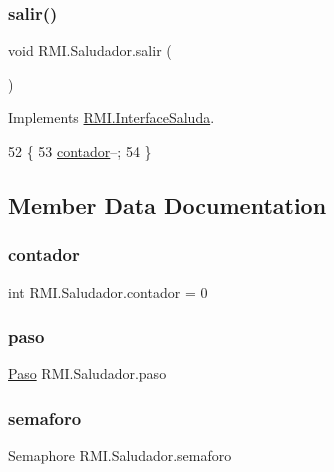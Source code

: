 \subsubsection{\texorpdfstring{salir()}{salir()}}
{\footnotesize\ttfamily void R\+M\+I.\+Saludador.\+salir (\begin{DoxyParamCaption}{ }\end{DoxyParamCaption})\hspace{0.3cm}{\ttfamily [inline]}}



Implements \mbox{\hyperlink{interface_r_m_i_1_1_interface_saluda_a9bfad049387b9c751039d6c796f30db6}{R\+M\+I.\+Interface\+Saluda}}.


\begin{DoxyCode}
52     \{
53         \mbox{\hyperlink{class_r_m_i_1_1_saludador_aee589ef80147254fc33e2b73d5f8ca2b}{contador}}--;
54     \}
\end{DoxyCode}


\subsection{Member Data Documentation}
\mbox{\label{class_r_m_i_1_1_saludador_aee589ef80147254fc33e2b73d5f8ca2b}} 
\subsubsection{\texorpdfstring{contador}{contador}}
{\footnotesize\ttfamily int R\+M\+I.\+Saludador.\+contador = 0\hspace{0.3cm}{\ttfamily [package]}}

\mbox{\label{class_r_m_i_1_1_saludador_acf8f2452f97fd371135558ba37283fa4}} 
\subsubsection{\texorpdfstring{paso}{paso}}
{\footnotesize\ttfamily \mbox{\hyperlink{class_r_m_i_1_1_paso}{Paso}} R\+M\+I.\+Saludador.\+paso\hspace{0.3cm}{\ttfamily [private]}}

\mbox{\label{class_r_m_i_1_1_saludador_a772baa4676a1aa111b792ebd3d77cfcd}} 
\subsubsection{\texorpdfstring{semaforo}{semaforo}}
{\footnotesize\ttfamily Semaphore R\+M\+I.\+Saludador.\+semaforo\hspace{0.3cm}{\ttfamily [package]}}


